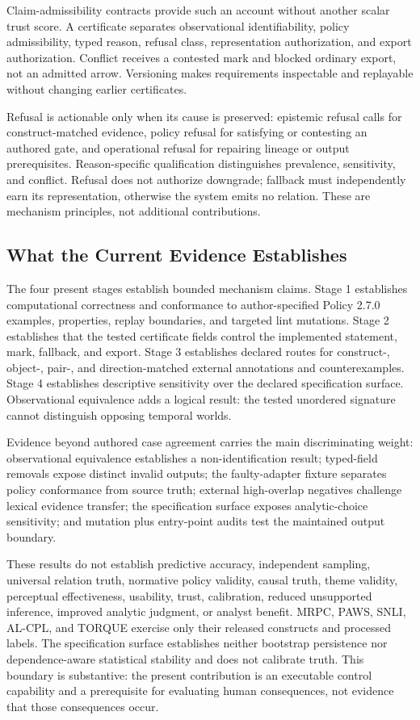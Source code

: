 \documentclass[manuscript,screen,review]{acmart}
\begin{document}
Claim-admissibility contracts provide such an account without another scalar trust score. A certificate separates observational identifiability, policy admissibility, typed reason, refusal class, representation authorization, and export authorization. Conflict receives a contested mark and blocked ordinary export, not an admitted arrow. Versioning makes requirements inspectable and replayable without changing earlier certificates.

Refusal is actionable only when its cause is preserved: epistemic refusal calls for construct-matched evidence, policy refusal for satisfying or contesting an authored gate, and operational refusal for repairing lineage or output prerequisites. Reason-specific qualification distinguishes prevalence, sensitivity, and conflict. Refusal does not authorize downgrade; fallback must independently earn its representation, otherwise the system emits no relation. These are mechanism principles, not additional contributions.

\subsection{What the Current Evidence Establishes}

The four present stages establish bounded mechanism claims. Stage 1 establishes computational correctness and conformance to author-specified Policy 2.7.0 examples, properties, replay boundaries, and targeted lint mutations. Stage 2 establishes that the tested certificate fields control the implemented statement, mark, fallback, and export. Stage 3 establishes declared routes for construct-, object-, pair-, and direction-matched external annotations and counterexamples. Stage 4 establishes descriptive sensitivity over the declared specification surface. Observational equivalence adds a logical result: the tested unordered signature cannot distinguish opposing temporal worlds.

Evidence beyond authored case agreement carries the main discriminating weight: observational equivalence establishes a non-identification result; typed-field removals expose distinct invalid outputs; the faulty-adapter fixture separates policy conformance from source truth; external high-overlap negatives challenge lexical evidence transfer; the specification surface exposes analytic-choice sensitivity; and mutation plus entry-point audits test the maintained output boundary.

These results do not establish predictive accuracy, independent sampling, universal relation truth, normative policy validity, causal truth, theme validity, perceptual effectiveness, usability, trust, calibration, reduced unsupported inference, improved analytic judgment, or analyst benefit. MRPC, PAWS, SNLI, AL-CPL, and TORQUE exercise only their released constructs and processed labels. The specification surface establishes neither bootstrap persistence nor dependence-aware statistical stability and does not calibrate truth. This boundary is substantive: the present contribution is an executable control capability and a prerequisite for evaluating human consequences, not evidence that those consequences occur.
\end{document}
